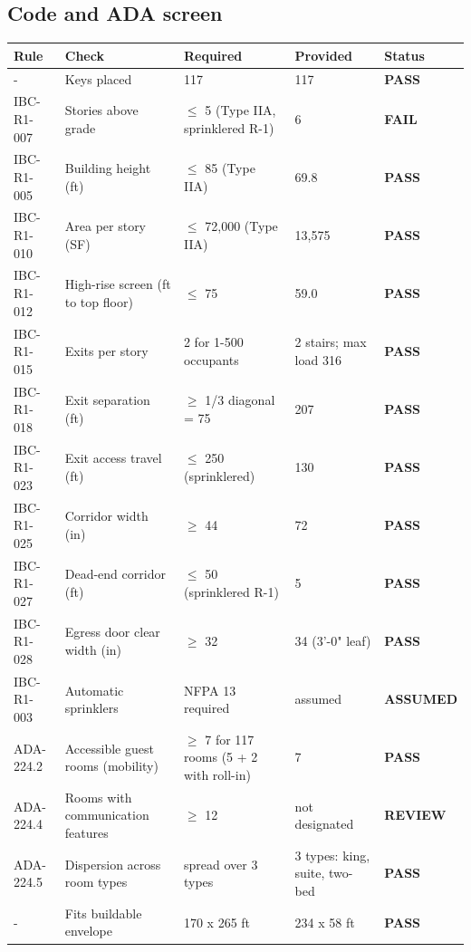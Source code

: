 \documentclass[10pt]{article}
\begin{document}
\subsection{Code and ADA screen}
{\small \begin{longtable}{p{1.8cm}p{4.4cm}p{4.4cm}p{3.4cm}p{1.4cm}}
\toprule
\textbf{Rule} & \textbf{Check} & \textbf{Required} & \textbf{Provided} & \textbf{Status} \\ \midrule \endhead
- & Keys placed & 117 & 117 & \textcolor{pass}{\textbf{PASS}} \\
IBC-R1-007 & Stories above grade & $\le$ 5 (Type IIA, sprinklered R-1) & 6 & \textcolor{fail}{\textbf{FAIL}} \\
IBC-R1-005 & Building height (ft) & $\le$ 85 (Type IIA) & 69.8 & \textcolor{pass}{\textbf{PASS}} \\
IBC-R1-010 & Area per story (SF) & $\le$ 72,000 (Type IIA) & 13,575 & \textcolor{pass}{\textbf{PASS}} \\
IBC-R1-012 & High-rise screen (ft to top floor) & $\le$ 75 & 59.0 & \textcolor{pass}{\textbf{PASS}} \\
IBC-R1-015 & Exits per story & 2 for 1-500 occupants & 2 stairs; max load 316 & \textcolor{pass}{\textbf{PASS}} \\
IBC-R1-018 & Exit separation (ft) & $\ge$ 1/3 diagonal = 75 & 207 & \textcolor{pass}{\textbf{PASS}} \\
IBC-R1-023 & Exit access travel (ft) & $\le$ 250 (sprinklered) & 130 & \textcolor{pass}{\textbf{PASS}} \\
IBC-R1-025 & Corridor width (in) & $\ge$ 44 & 72 & \textcolor{pass}{\textbf{PASS}} \\
IBC-R1-027 & Dead-end corridor (ft) & $\le$ 50 (sprinklered R-1) & 5 & \textcolor{pass}{\textbf{PASS}} \\
IBC-R1-028 & Egress door clear width (in) & $\ge$ 32 & 34 (3'-0" leaf) & \textcolor{pass}{\textbf{PASS}} \\
IBC-R1-003 & Automatic sprinklers & NFPA 13 required & assumed & \textcolor{muted}{\textbf{ASSUMED}} \\
ADA-224.2 & Accessible guest rooms (mobility) & $\ge$ 7 for 117 rooms (5 + 2 with roll-in) & 7 & \textcolor{pass}{\textbf{PASS}} \\
ADA-224.4 & Rooms with communication features & $\ge$ 12 & not designated & \textcolor{warn}{\textbf{REVIEW}} \\
ADA-224.5 & Dispersion across room types & spread over 3 types & 3 types: king, suite, two-bed & \textcolor{pass}{\textbf{PASS}} \\
- & Fits buildable envelope & 170 x 265 ft & 234 x 58 ft & \textcolor{pass}{\textbf{PASS}} \\
\bottomrule
\end{longtable}}
\end{document}
